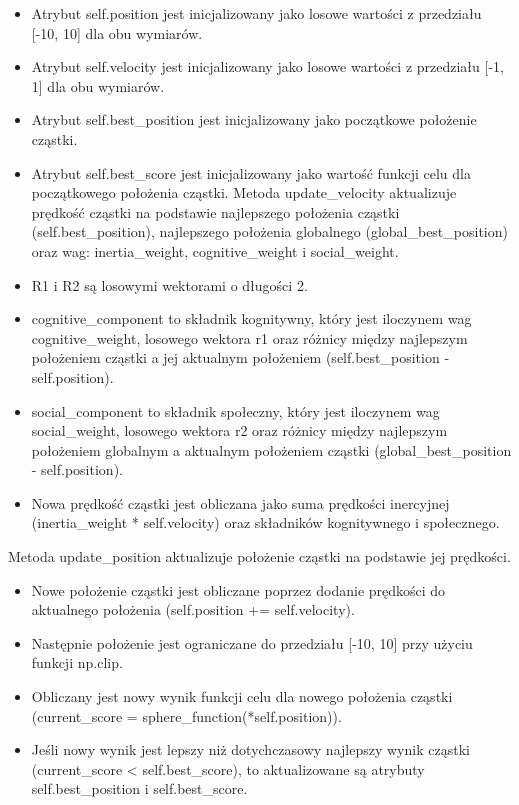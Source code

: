 \documentclass[11pt]{article}
\providecommand{\tightlist}{%
      \setlength{\itemsep}{0pt}\setlength{\parskip}{0pt}}
\begin{document}
\begin{itemize}
\item
  Atrybut self.position jest inicjalizowany jako losowe wartości z
  przedziału {[}-10, 10{]} dla obu wymiarów.
\item
  Atrybut self.velocity jest inicjalizowany jako losowe wartości z
  przedziału {[}-1, 1{]} dla obu wymiarów.
\item
  Atrybut self.best\_position jest inicjalizowany jako początkowe
  położenie cząstki.
\item
  Atrybut self.best\_score jest inicjalizowany jako wartość funkcji celu
  dla początkowego położenia cząstki. Metoda update\_velocity
  aktualizuje prędkość cząstki na podstawie najlepszego położenia
  cząstki (self.best\_position), najlepszego położenia globalnego
  (global\_best\_position) oraz wag: inertia\_weight, cognitive\_weight
  i social\_weight.
\item
  R1 i R2 są losowymi wektorami o długości 2.
\item
  cognitive\_component to składnik kognitywny, który jest iloczynem wag
  cognitive\_weight, losowego wektora r1 oraz różnicy między najlepszym
  położeniem cząstki a jej aktualnym położeniem (self.best\_position -
  self.position).
\item
  social\_component to składnik społeczny, który jest iloczynem wag
  social\_weight, losowego wektora r2 oraz różnicy między najlepszym
  położeniem globalnym a aktualnym położeniem cząstki
  (global\_best\_position - self.position).
\item
  Nowa prędkość cząstki jest obliczana jako suma prędkości inercyjnej
  (inertia\_weight * self.velocity) oraz składników kognitywnego i
  społecznego.
\end{itemize}

Metoda update\_position aktualizuje położenie cząstki na podstawie jej
prędkości.

\begin{itemize}
\tightlist
\item
  Nowe położenie cząstki jest obliczane poprzez dodanie prędkości do
  aktualnego położenia (self.position += self.velocity).
\item
  Następnie położenie jest ograniczane do przedziału {[}-10, 10{]} przy
  użyciu funkcji np.clip.
\item
  Obliczany jest nowy wynik funkcji celu dla nowego położenia cząstki
  (current\_score = sphere\_function(*self.position)).
\item
  Jeśli nowy wynik jest lepszy niż dotychczasowy najlepszy wynik cząstki
  (current\_score \textless{} self.best\_score), to aktualizowane są
  atrybuty self.best\_position i self.best\_score.
\end{itemize}
\end{document}
